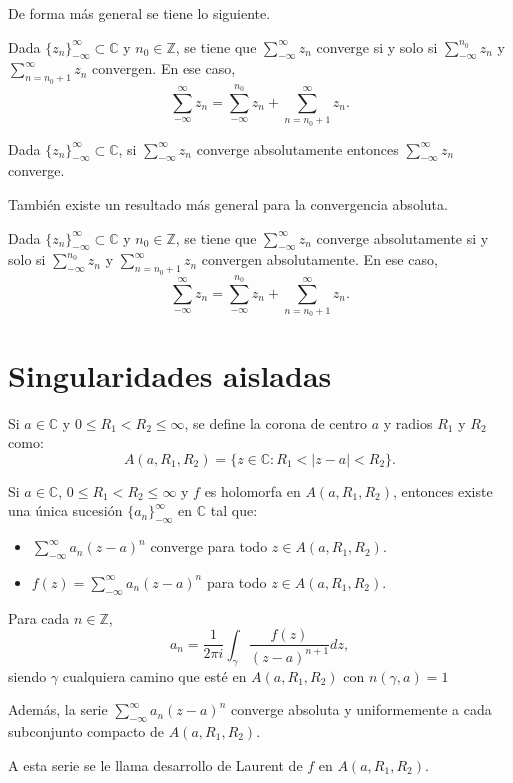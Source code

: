 
De forma más general se tiene lo siguiente.

\begin{proposition}
    Dada $\{z_n\}_{-\infty}^\infty \subset \mathbb{C}$ y $n_0 \in \mathbb{Z}$, se tiene que $\sum_{-\infty}^\infty z_n$ converge si y solo si $\sum_{-\infty}^{n_0} z_n$ y $\sum_{n=n_0+1}^\infty z_n$ convergen.
    En ese caso,
    $$\sum_{-\infty}^\infty z_n = \sum_{-\infty}^{n_0} z_n + \sum_{n=n_0+1}^\infty z_n.$$
\end{proposition}

\begin{proposition}
    Dada $\{z_n\}_{-\infty}^\infty \subset \mathbb{C}$, si $\sum_{-\infty}^\infty z_n$ converge absolutamente entonces $\sum_{-\infty}^\infty z_n$ converge.
\end{proposition}


También existe un resultado más general para la convergencia absoluta.
\begin{proposition}
    Dada $\{z_n\}_{-\infty}^\infty \subset \mathbb{C}$ y $n_0 \in \mathbb{Z}$, se tiene que $\sum_{-\infty}^\infty z_n$ converge absolutamente si y solo si $\sum_{-\infty}^{n_0} z_n$ y $\sum_{n=n_0+1}^\infty z_n$ convergen absolutamente.
    En ese caso,
    $$\sum_{-\infty}^\infty z_n = \sum_{-\infty}^{n_0} z_n + \sum_{n=n_0+1}^\infty z_n.$$
\end{proposition}

\section{Singularidades aisladas}
\begin{definition}
    Si $a \in \mathbb{C}$ y $0 \leq R_1 < R_2 \leq \infty$, se define la corona de centro $a$ y radios $R_1$ y $R_2$ como:
    $$A(a, R_1, R_2) = \{z \in \mathbb{C} : R_1 < |z-a| < R_2\}.$$
\end{definition}

\begin{theorem}
    Si $a \in \mathbb{C}$, $0 \leq R_1 < R_2 \leq \infty$ y $f$ es holomorfa en $A(a, R_1, R_2)$, entonces existe una única sucesión $\{a_n\}_{-\infty}^\infty$ en $\mathbb{C}$ tal que:
    \begin{itemize}
        \item $\sum_{-\infty}^\infty a_n(z-a)^n$ converge para todo $z \in A(a, R_1, R_2)$.
        \item $f(z) = \sum_{-\infty}^\infty a_n(z-a)^n$ para todo $z \in A(a, R_1, R_2)$.
    \end{itemize}

    Para cada $n \in \mathbb{Z}$,
    $$a_n = \frac{1}{2\pi i} \int_\gamma \frac{f(z)}{(z-a)^{n+1}}dz,$$
    siendo $\gamma$ cualquiera camino que esté en $A(a, R_1, R_2)$ con $n(\gamma, a) = 1$

    Además, la serie $\sum_{-\infty}^\infty a_n(z-a)^n$ converge absoluta y uniformemente a cada subconjunto compacto de $A(a, R_1, R_2)$.

    A esta serie se le llama desarrollo de Laurent de $f$ en $A(a, R_1, R_2)$.
\end{theorem}

